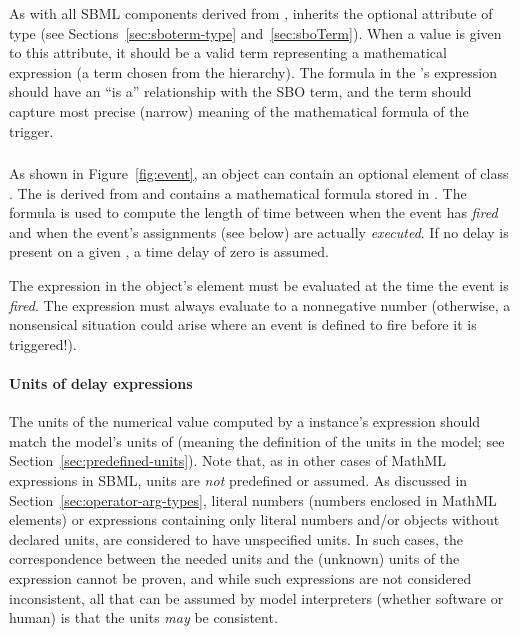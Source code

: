 As with all SBML components derived from \SBase, \Trigger inherits
the optional attribute  of type
 (see Sections~\ref{sec:sboterm-type}
and~\ref{sec:sboTerm}).  When a value is given to this
attribute, it should be a valid term representing a
mathematical expression (\ie a term chosen from the
\sbomathformula hierarchy).  The formula in the \Trigger's
 expression should have an ``is a'' relationship with
the SBO term, and the term should capture most precise (narrow)
meaning of the mathematical formula of the trigger.


\subsubsection{}
\label{sec:event-delay}

As shown in Figure~\ref{fig:event}, an \Event object can contain
an optional  element of class \Delay.  The \Delay is
derived from \SBase and contains a mathematical formula stored in
.  The formula is used to compute the length of time
between when the event has \emph{fired} and when the event's
assignments (see below) are actually \emph{executed}.  If no delay
is present on a given \Event, a time delay of zero is assumed.

The expression in the \Delay object's  element must be evaluated at the time the
event is \emph{fired}.  The expression must always evaluate to a
nonnegative number (otherwise, a nonsensical situation could arise
where an event is defined to fire before it is triggered!).  


\paragraph{Units of delay expressions}

The units of the numerical value computed by a \Delay instance's
 expression should match the model's units of
 (meaning the definition of the  units in
the model; see Section~\ref{sec:predefined-units}).  Note that, as
in other cases of MathML expressions in SBML, units are \emph{not}
predefined or assumed.  As discussed in
Section~\ref{sec:operator-arg-types}, literal numbers (\ie numbers
enclosed in MathML  elements) or expressions containing
only literal numbers and/or \Parameter objects without declared
units, are considered to have unspecified units.  In such cases,
the correspondence between the needed units and the (unknown)
units of the \Delay {} expression cannot be proven, and
while such expressions are not considered inconsistent, all that
can be assumed by model interpreters (whether software or human)
is that the units \emph{may} be consistent.

